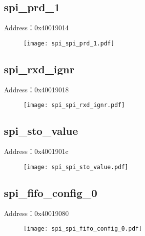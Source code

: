 \subsection{spi\_prd\_1}
\label{spi-spi-prd-1}
Address：0x40019014
 \begin{figure}[H]
\texttt{[image: spi\_spi\_prd\_1.pdf]}
\end{figure}

\subsection{spi\_rxd\_ignr}
\label{spi-spi-rxd-ignr}
Address：0x40019018
 \begin{figure}[H]
\texttt{[image: spi\_spi\_rxd\_ignr.pdf]}
\end{figure}

\subsection{spi\_sto\_value}
\label{spi-spi-sto-value}
Address：0x4001901c
 \begin{figure}[H]
\texttt{[image: spi\_spi\_sto\_value.pdf]}
\end{figure}

\subsection{spi\_fifo\_config\_0}
\label{spi-spi-fifo-config-0}
Address：0x40019080
 \begin{figure}[H]
\texttt{[image: spi\_spi\_fifo\_config\_0.pdf]}
\end{figure}

